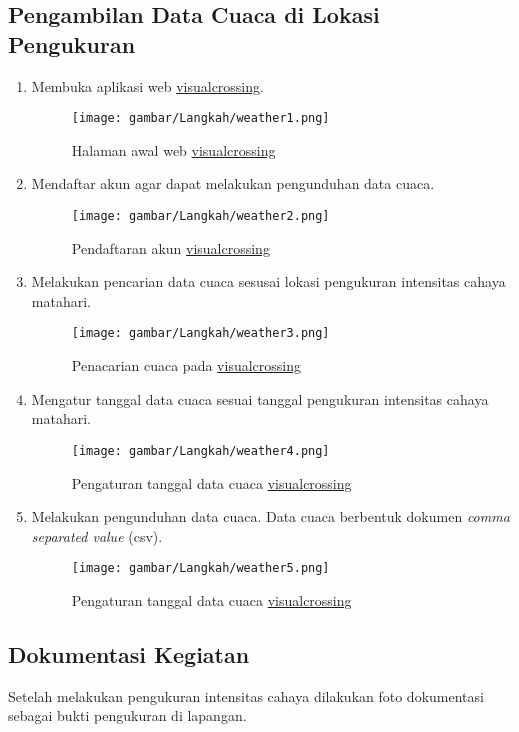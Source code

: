 \subsection{Pengambilan Data Cuaca di Lokasi Pengukuran}
\begin{enumerate}[leftmargin=*, label=\alph*]
    \item Membuka aplikasi web \href{https://www.visualcrossing.com/weather-history}{visualcrossing}.
    \begin{figure}[H]
        \centering
        \texttt{[image: gambar/Langkah/weather1.png]}
        \caption{Halaman awal web \href{https://www.visualcrossing.com/weather-history}{visualcrossing}}
    \end{figure}
    \item Mendaftar akun agar dapat melakukan pengunduhan data cuaca.
    \begin{figure}[H]
        \centering
        \texttt{[image: gambar/Langkah/weather2.png]}
        \caption{Pendaftaran akun \href{https://www.visualcrossing.com/weather-history}{visualcrossing}}
    \end{figure}
    \item Melakukan pencarian data cuaca sesusai lokasi pengukuran intensitas cahaya matahari.
    \begin{figure}[H]
        \centering
        \texttt{[image: gambar/Langkah/weather3.png]}
        \caption{Penacarian cuaca pada \href{https://www.visualcrossing.com/weather-history}{visualcrossing}}
    \end{figure}
    \item Mengatur tanggal data cuaca sesuai tanggal pengukuran intensitas cahaya matahari.
    \begin{figure}[H]
        \centering
        \texttt{[image: gambar/Langkah/weather4.png]}
        \caption{Pengaturan tanggal data cuaca \href{https://www.visualcrossing.com/weather-history}{visualcrossing}}
    \end{figure}
    \item Melakukan pengunduhan data cuaca. Data cuaca berbentuk dokumen \textit{comma separated value} (csv).
    \begin{figure}[H]
        \centering
        \texttt{[image: gambar/Langkah/weather5.png]}
        \caption{Pengaturan tanggal data cuaca \href{https://www.visualcrossing.com/weather-history}{visualcrossing}}
    \end{figure}
\end{enumerate}
\subsection{Dokumentasi Kegiatan}
Setelah melakukan pengukuran intensitas cahaya dilakukan foto dokumentasi sebagai bukti pengukuran di lapangan.